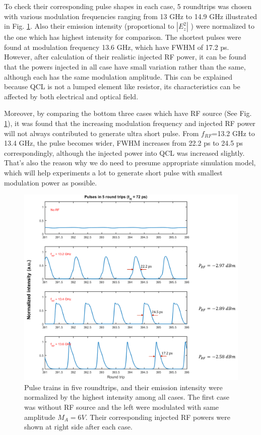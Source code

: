 \documentclass[11pt,final]{scrbook}
\begin{document}
To check their corresponding pulse shapes in each case, 5 roundtrips was chosen with various modulation frequencies ranging from 13 GHz to 14.9 GHz illustrated in Fig. \ref{fig:Pulse_modF}. Also their emission intensity (proportional to $|E_{z}^{2}|$ ) were normalized to the one which has highest intensity for comparison.  The shortest pulses were found at modulation frequency 13.6 GHz, which have FWHM of 17.2 ps. However, after calculation of their realistic injected RF power, it can be found that the powers injected in all case have small variation rather than the same, although each has the same modulation amplitude. This can be explained because QCL is not a lumped element like resistor, its characteristics can be affected by both electrical and optical field.

Moreover, by comparing the bottom three cases which have RF source (See Fig. \ref{fig:Pulse_modF}), it was found that the increasing modulation frequency and injected RF power will not always contributed to generate ultra short pulse. From $f_{RF}$=13.2 GHz to 13.4 GHz, the pulse becomes wider, FWHM increases from 22.2 ps to 24.5 ps correspondingly, although the injected power into QCL was increased slightly. That's also the reason why we do need to presume appropriate simulation model, which will help experiments a lot to generate short pulse with smallest modulation power as possible.
\begin{figure}[htbp]
\begin{center}
\includegraphics[scale=0.5]{images/Pulse_modF.pdf}
\caption{Pulse trains in five roundtrips, and their emission intensity were normalized by the highest intensity among all cases. The first case was without RF source and the left were modulated with same amplitude $M_{A} = 6 V$. Their corresponding injected RF powers were shown at right side after each case.}
\label{fig:Pulse_modF}
\end{center}
\end{figure}
\end{document}
